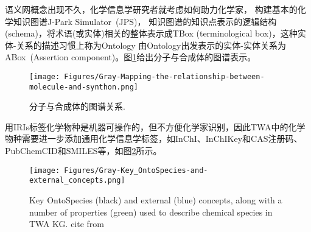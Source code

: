 语义网概念出现不久，化学信息学研究者就考虑如何助力化学家，%
构建基本的化学知识图谱\textrm{J-Park Simulator~(JPS)}，%
知识图谱的知识点表示的逻辑结构\textrm{(schema)}，将术语(或实体)相关的整体表示成\textrm{TBox}%
\textrm{(terminological box)}，这种实体-关系的描述习惯上称为\textrm{Ontology}%
由\textrm{Ontology}出发表示的实体-实体关系为\textrm{ABox~(Assertion component)}。图\ref{Fig:Mapping-relationship-molecule-synthon}给出分子与合成体的图谱表示。 
\begin{figure}[h!]
\centering
\texttt{[image: Figures/Gray-Mapping-the-relationship-between-molecule-and-synthon.png]}
\caption{\small\textrm{分子与合成体的图谱关系. }}%
\label{Fig:Mapping-relationship-molecule-synthon}
\end{figure}

用\textrm{IRIs}标签化学物种是机器可操作的，但不方便化学家识别，因此\textrm{TWA}中的化学物种需要进一步添加通用化学信息学标签，如\textrm{\textrm{InChI}}、\textrm{InChIKey}和\textrm{CAS}注册码、\textrm{PubChemCID}和\textrm{SMILES}等，如图\ref{Fig:Key-OntoSpecies-and-external-concepts}所示。
\begin{figure}[h!]
\centering
\texttt{[image: Figures/Gray-Key\_OntoSpecies-and-external\_concepts.png]}
\caption{\small\textrm{Key OntoSpecies (black) and external (blue) concepts, along with a number of properties (green) used to describe chemical species in TWA KG. cite from~\cite{ACR56-128_2023}}}%
\label{Fig:Key-OntoSpecies-and-external-concepts}
\end{figure}

